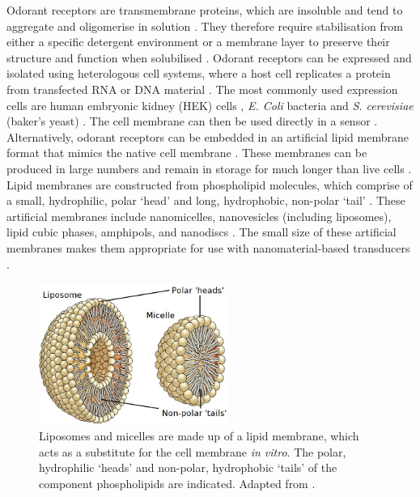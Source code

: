 \documentclass[
  a4paper,
]{scrbook}
\begin{document}
Odorant receptors are transmembrane proteins, which are insoluble and
tend to aggregate and oligomerise in solution \autocite{Nath2007}. They
therefore require stabilisation from either a specific detergent
environment or a membrane layer to preserve their structure and function
when solubilised \autocite{Fruh2011,Dung2018}. Odorant receptors can be
expressed and isolated using heterologous cell systems, where a host
cell replicates a protein from transfected RNA or DNA material
\autocite{Glatz2011,Dung2018}. The most commonly used expression cells
are human embryonic kidney (HEK) cells \autocite{Lim2014,Ahn2020},
\emph{E. Coli} bacteria \autocite{Yang2017,Yang2018} and \emph{S.
cerevisiae} (baker's yeast) \autocite{Bohbot2020}. The cell membrane can
then be used directly in a sensor \autocite{Dung2018}. Alternatively,
odorant receptors can be embedded in an artificial lipid membrane format
that mimics the native cell membrane \autocite{Nath2007}. These
membranes can be produced in large numbers and remain in storage for
much longer than live cells \autocite{Goldsmith2011,Lim2015}. Lipid
membranes are constructed from phospholipid molecules, which comprise of
a small, hydrophilic, polar `head' and long, hydrophobic, non-polar
`tail' \autocite{Bose2021,Ramadon2022}. These artificial membranes
include nanomicelles, nanovesicles (including liposomes), lipid cubic
phases, amphipols, and nanodiscs \autocite{Fruh2011,Yang2018}. The small
size of these artificial membranes makes them appropriate for use with
nanomaterial-based transducers \autocite{Lim2015,Dung2018}.

\begin{figure}

{\centering \includegraphics[width=0.55\textwidth,height=\textheight]{figures/ch3/OSC_Microbio_07_03_micelle_edit.png}

}

\caption{\label{fig-micelle}Liposomes and micelles are made up of a
lipid membrane, which acts as a substitute for the cell membrane
\emph{in vitro}. The polar, hydrophilic `heads' and non-polar,
hydrophobic `tails' of the component phospholipids are indicated.
Adapted from \autocite{Micelle}.}

\end{figure}
\end{document}
